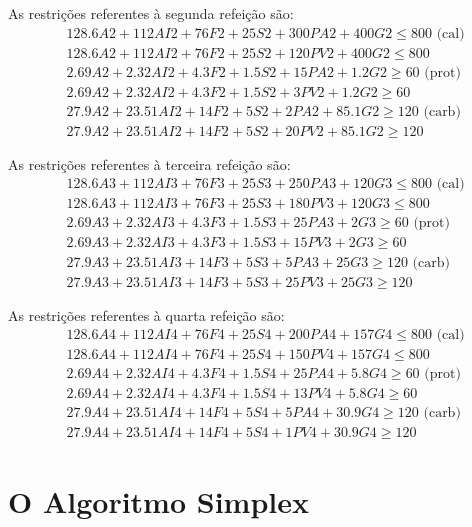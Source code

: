 \documentclass{article}
\begin{document}
As restrições referentes à segunda refeição são:
\begin{align*}
& 128.6A2 + 112AI2 + 76F2 + 25S2 + 300PA2 + 400G2 \leq 800 \text{ (cal)} \\
& 128.6A2 + 112AI2 + 76F2 + 25S2 + 120PV2 + 400G2 \leq 800 \\
& 2.69A2 + 2.32AI2 + 4.3F2 + 1.5S2 + 15PA2 + 1.2G2 \geq 60 \text{ (prot)} \\
& 2.69A2 + 2.32AI2 + 4.3F2 + 1.5S2 + 3PV2 + 1.2G2 \geq 60 \\
& 27.9A2 + 23.51AI2 + 14F2 + 5S2 + 2PA2 + 85.1G2 \geq 120 \text{ (carb)} \\
& 27.9A2 + 23.51AI2 + 14F2 + 5S2 + 20PV2 + 85.1G2 \geq 120
\end{align*}

As restrições referentes à terceira refeição são:
\begin{align*}
& 128.6A3 + 112AI3 + 76F3 + 25S3 + 250PA3 + 120G3 \leq 800 \text{ (cal)} \\
& 128.6A3 + 112AI3 + 76F3 + 25S3 + 180PV3 + 120G3 \leq 800 \\
& 2.69A3 + 2.32AI3 + 4.3F3 + 1.5S3 + 25PA3 + 2G3 \geq 60 \text{ (prot)} \\
& 2.69A3 + 2.32AI3 + 4.3F3 + 1.5S3 + 15PV3 + 2G3 \geq 60 \\
& 27.9A3 + 23.51AI3 + 14F3 + 5S3 + 5PA3 + 25G3 \geq 120 \text{ (carb)} \\
& 27.9A3 + 23.51AI3 + 14F3 + 5S3 + 25PV3 + 25G3 \geq 120
\end{align*}


As restrições referentes à quarta refeição são:
\begin{align*}
& 128.6A4 + 112AI4 + 76F4 + 25S4 + 200PA4 + 157G4 \leq 800 \text{ (cal)} \\
& 128.6A4 + 112AI4 + 76F4 + 25S4 + 150PV4 + 157G4 \leq 800 \\
& 2.69A4 + 2.32AI4 + 4.3F4 + 1.5S4 + 25PA4 + 5.8G4 \geq 60 \text{ (prot)} \\
& 2.69A4 + 2.32AI4 + 4.3F4 + 1.5S4 + 13PV4 + 5.8G4 \geq 60 \\
& 27.9A4 + 23.51AI4 + 14F4 + 5S4 + 5PA4 + 30.9G4 \geq 120 \text{ (carb)} \\
& 27.9A4 + 23.51AI4 + 14F4 + 5S4 + 1PV4 + 30.9G4 \geq 120
\end{align*}

\section{O Algoritmo Simplex}
\end{document}
